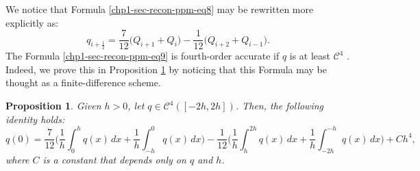 We notice that Formula \eqref{chp1-sec-recon-ppm-eq8} may be rewritten more explicitly as:
\begin{equation}
	\label{chp1-sec-recon-ppm-eq9}
	q_{i+\frac{1}{2}} = \frac{7}{12} \bigg( Q_{i+1} + Q_{i} \bigg) - \frac{1}{12} \bigg(  Q_{i+2} +Q_{i-1}\bigg).
\end{equation}
The Formula \eqref{chp1-sec-recon-ppm-eq9} is fourth-order accurate if
$q$ is at least $\mathcal{C}^4$ \citep{colella:1984}. Indeed, we
prove this in Proposition \ref{prop:ppm-bound1} by noticing
that this Formula may be thought as a finite-difference scheme.

\theoremstyle{plain} %
\newtheorem{lema}{Lemma}[chapter]


\theoremstyle{plain} %
\newtheorem{prop}{Proposition}[chapter]

\begin{prop}
	\label{prop:ppm-bound1}
	Given $h>0$, let $q \in \mathcal{C}^{4}([-2h,2h])$. Then, the following identity
	holds:
	\begin{equation}
		\label{prop:ppm-bound1-eq1}
		q(0) = \frac{7}{12}\bigg( \frac{1}{h} \int_{0}^{h} q(x) \,dx 
		       + \frac{1}{h} \int_{-h}^{0} q(x) \,dx  \bigg)
		       - \frac{1}{12}\bigg( \frac{1}{h} \int_{h}^{2h} q(x) \,dx 
		       + \frac{1}{h} \int_{-2h}^{-h} q(x) \,dx  \bigg) + Ch^4,
	\end{equation}
	where $C$ is a constant that depends only on $q$ and $h$.
\end{prop}

